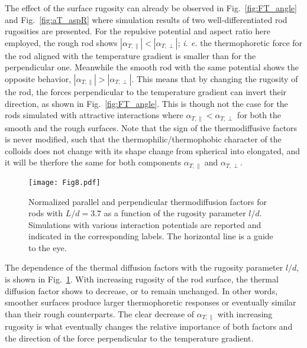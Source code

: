 \documentclass[aps,pre,twocolumn,showpacs,superscriptaddress]{revtex4-1}
\begin{document}
The effect of the surface rugosity can already be observed in
Fig.~\ref{fig:FT_angle} and Fig.~\ref{fig:aT_aspR} where simulation
results of two well-differentiated rod rugosities are presented.  For
the repulsive potential and aspect ratio here employed, the rough rod
shows $|\alpha_{T,\|}| < |\alpha_{T,\perp}|$; {\em i. e.} the
thermophoretic force for the rod aligned with the temperature gradient
is smaller than for the perpendicular one. Meanwhile the smooth rod
with the same potential shows the opposite behavior, $|\alpha_{T,\|}|
> |\alpha_{T,\perp}|$. This means that by changing the rugosity of the
rod, the forces perpendicular to the temperature gradient can invert
their direction, as shown in Fig.~\ref{fig:FT_angle}. %
This is though not the case for the rods simulated with attractive
interactions where $\alpha_{T,\|} < \alpha_{T,\perp}$ for both the
smooth and the rough surfaces. %
Note that the sign of the thermodiffusive factors is never modified,
such that the thermophilic/thermophobic character of the colloids does
not change with its shape change from spherical into elongated, and it
will be therfore the same for both components $\alpha_{T,\|}$ and
$\alpha_{T,\perp}$. %


\begin{figure}[h!]
\texttt{[image: Fig8.pdf]}
\caption{\label{fig:aT_pp} Normalized parallel and perpendicular
  thermodiffusion factors for rods with $L/d=3.7$ as a
  function of the rugosity parameter $l/d$.  Simulations with various
  interaction potentials are reported and indicated in the
  corresponding labels. The horizontal line is a guide to the
  eye.}
\end{figure}
The dependence of the thermal diffusion factors with the rugosity
parameter $l/d$, is shown in Fig.~\ref{fig:aT_pp}.  With increasing
rugosity of the rod surface, the thermal diffusion factor shows to
decrease, or to remain unchanged. In other words, smoother surfaces
produce larger thermophoretic responses or eventually similar than
their rough counterparts.  The clear decrease of $\alpha_{T,\|}$ with
increasing rugosity is what eventually changes the relative importance
of both factors and the direction of the force perpendicular to the
temperature gradient.
\end{document}
